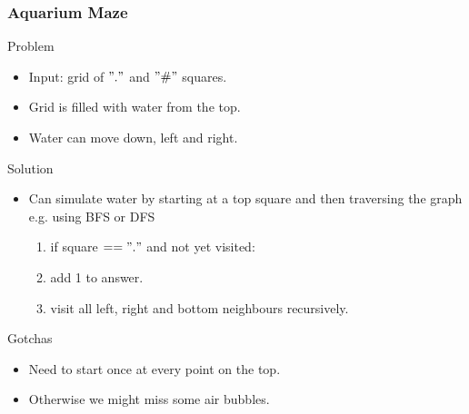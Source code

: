 \documentclass{beamer}
\begin{document}
\begin{frame}
    \frametitle{Aquarium  Maze}
    \begin{block}{Problem}
        \begin{itemize}
            \item Input: grid of $"."$ and $"\#"$ squares.
            \item Grid is filled with water from the top.
            \item Water can move down, left and right.
        \end{itemize}
    \end{block}
    \begin{block}{Solution}
        \begin{itemize}
            \item Can simulate water by starting at a top square and then traversing the graph e.g. using BFS or DFS
            \begin{enumerate}
                \item if square $== "."$ and not yet visited:
                \item add 1 to answer.
                \item visit all left, right and bottom neighbours recursively.
            \end{enumerate}
        \end{itemize}
    \end{block}
    \begin{block}{Gotchas}
        \begin{itemize}
            \item Need to start once at every point on the top.
            \item Otherwise we might miss some air bubbles.
        \end{itemize}
    \end{block}
\end{frame}
\end{document}
